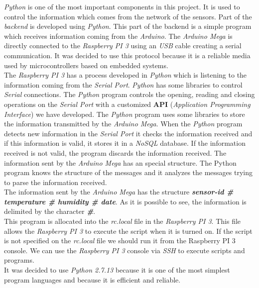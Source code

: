 \textit{Python} is one of the most important components in this project. It is used to control the information which comes from the network of the sensors. Part of the \textit{backend} is developed using \textit{Python}. This part of the backend is a simple program which receives information coming from the \textit{Arduino}. The \textit{Arduino Mega} is directly connected to the \textit{Raspberry PI 3} using an \textit{USB} cable creating a serial communication. It was decided to use this protocol because it is a reliable media used by microcontrollers based on embedded systems.\\

The \textit{Raspberry PI 3} has a process developed in \textit{Python} which is listening to the information coming from the \textit{Serial Port}. \textit{Python} has some libraries to control \textit{Serial} connections. The \textit{Python} program controls the opening, reading and closing operations on the \textit{Serial Port} with a customized \textbf{API} \cite{API} (\textit{Application Programming Interface}) we have developed. The \textit{Python} program uses some libraries to store the information transmitted by the \textit{Arduino Mega}. When the \textit{Python} program detects new information in the \textit{Serial Port} it checks the information received and if this information is valid, it stores it in a \textit{NoSQL} database. If the information received is not valid, the program discards the information received. The information sent by the \textit{Arduino Mega} has an special structure. The Python program knows the structure of the messages and it analyzes the messages trying to parse the information received.\\

The information sent by the \textit{Arduino Mega} has the structure \textit{\textbf{sensor-id \# temperature \# humidity \# date}}. As it is possible to see, the information is delimited by the character \textbf{\textit{\#}}.\\

This program is allocated into the \textit{rc.local} file in the \textit{Raspberry PI 3}. This file allows the \textit{Raspberry PI 3} to execute the script when it is turned on. If the script is not specified on the \textit{rc.local} file we should run it from the Raspberry PI 3 console. We can use the \textit{Raspberry PI 3} console via \textit{SSH} to execute scripts and programs.\\

It was decided to use \textit{Python 2.7.13} because it is one of the most simplest program languages and because it is efficient and reliable.

